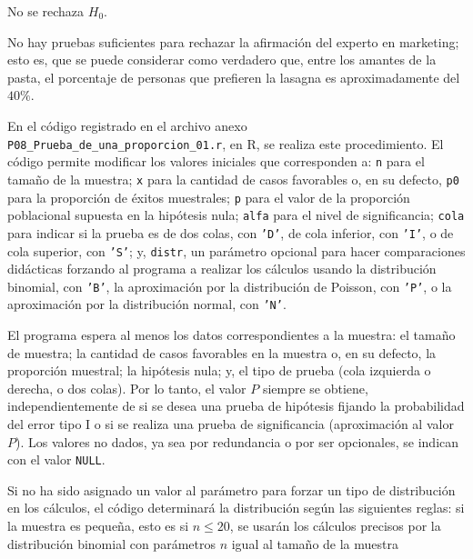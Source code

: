 \begin{solucion}
 \begin{decision}
  No se rechaza $H_0$.
 \end{decision}

 \begin{conclusion}
  No hay pruebas suficientes para rechazar la afirmaci\'on del experto en marketing;
  esto es, que se puede considerar como verdadero que, entre los amantes de la pasta,
  el porcentaje de personas que prefieren la lasagna es aproximadamente del $40\%$.
 \end{conclusion}

 En el c\'odigo registrado en el archivo anexo 
 \texttt{P08\_Prueba\_de\_una\_proporcion\_01.r}, en R, se realiza este procedimiento.
 El c\'odigo permite modificar los valores iniciales que corresponden a:
 \texttt{n} para el tama\~no de la muestra;
 \texttt{x} para la cantidad de casos favorables
 o, en su defecto, \texttt{p0} para la proporci\'on de \'exitos muestrales;
 \texttt{p} para el valor de la proporci\'on poblacional
 supuesta en la hip\'otesis nula;
 \texttt{alfa} para el nivel de significancia;
 \texttt{cola} para indicar si la prueba es de dos colas, con \texttt{'D'},
 de cola inferior, con \texttt{'I'}, o de cola superior, con \texttt{'S'};
 y, \texttt{distr}, un par\'ametro opcional para hacer comparaciones did\'acticas
 forzando al programa a realizar los c\'alculos usando la distribuci\'on binomial,
 con \texttt{'B'}, la aproximaci\'on por la distribuci\'on de Poisson,
 con \texttt{'P'}, o la aproximaci\'on por la distribuci\'on normal, con \texttt{'N'}.
 \par 
 El programa espera al menos los datos correspondientes a la muestra:
 el tama\~no de muestra; la cantidad de casos favorables en la muestra
 o, en su defecto, la proporci\'on muestral; la hip\'otesis nula;
 y, el tipo de prueba (cola izquierda o derecha, o dos colas).
 Por lo tanto, el valor $P$ siempre se obtiene,
 independientemente de si se desea una prueba de hip\'otesis
 fijando la probabilidad del error tipo I o si se realiza una prueba de significancia
 (aproximaci\'on al valor $P$).
 Los valores no dados, ya sea por redundancia o por ser opcionales, se indican
 con el valor \texttt{NULL}.
 \par
 Si no ha sido asignado un valor al par\'ametro para forzar un tipo de distribuci\'on
 en los c\'alculos, el c\'odigo determinar\'a la distribuci\'on
 seg\'un las siguientes reglas: si la muestra es peque\~na, esto es si $n\leq 20$,
 se usar\'an los c\'alculos precisos por la distribuci\'on binomial
 con par\'ametros $n$ igual al tama\~no de la muestra

\end{solucion}
